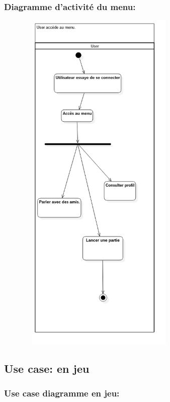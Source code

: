 \documentclass[10pt,a4paper]{article}
\begin{document}
 \subsubsection{Diagramme d'activité du menu:}

 \begin{center}
 
     \includegraphics[height=17cm,width=10cm]{user_serveur_diagramme.png}
 
 \end{center}
   
\newpage
\subsection{Use case: en jeu}

\subsubsection{Use case diagramme en jeu:}
\end{document}

